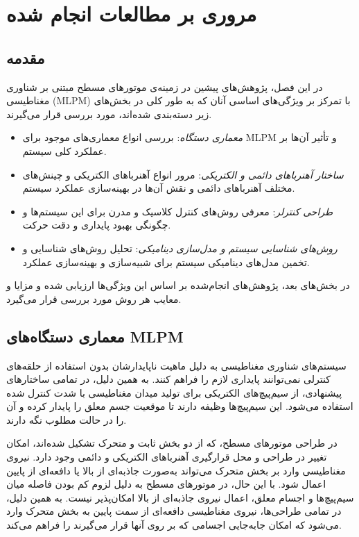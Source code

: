 \setcounter{topnumber}{5}      %
\setcounter{totalnumber}{5}    %
\renewcommand{\floatpagefraction}{.8}  %

\chapter{مروری بر مطالعات انجام شده}
\section{مقدمه}
در این فصل، پژوهش‌های پیشین در زمینه‌ی موتورهای مسطح مبتنی بر شناوری مغناطیسی (MLPM) با تمرکز بر ویژگی‌های اساسی آنان که به طور کلی در بخش‌های زیر دسته‌بندی شده‌اند، مورد بررسی قرار می‌گیرند. 
\begin{itemize}
	\item
		\textit{معماری دستگاه}:
بررسی انواع معماری‌های موجود برای MLPM و تأثیر آن‌ها بر عملکرد کلی سیستم.
	\item
		\textit{ساختار آهنرباهای دائمی و الکتریکی}:
مرور انواع آهنرباهای الکتریکی و چینش‌های مختلف آهنربا‌های دائمی و نقش آن‌ها در بهینه‌سازی عملکرد سیستم.
	\item
		\textit{طراحی کنترلر}:
معرفی روش‌های کنترل کلاسیک و مدرن برای این سیستم‌ها و چگونگی بهبود پایداری و دقت حرکت.
	\item
		\textit{روش‌های شناسایی سیستم و مدل‌سازی دینامیکی}:
تحلیل روش‌های شناسایی و تخمین مدل‌های دینامیکی سیستم برای شبیه‌سازی و بهینه‌سازی عملکرد.
\end{itemize}
در بخش‌های بعد، پژوهش‌های انجام‌شده بر اساس این ویژگی‌ها ارزیابی شده و مزایا و معایب هر روش مورد بررسی قرار می‌گیرد.

\section{معماری دستگاه‌های MLPM}
سیستم‌های شناوری مغناطیسی به دلیل ماهیت ناپایدارشان بدون استفاده از حلقه‌های کنترلی نمی‌توانند پایداری لازم را فراهم کنند. به همین دلیل، در تمامی ساختارهای پیشنهادی، از سیم‌پیچ‌های الکتریکی برای تولید میدان مغناطیسی با شدت کنترل ‌شده استفاده می‌شود. این سیم‌پیچ‌ها وظیفه دارند تا موقعیت جسم معلق را پایدار کرده و آن را در حالت مطلوب نگه ‌دارند.

در طراحی موتورهای مسطح، که از دو بخش ثابت
 و متحرک
تشکیل شده‌اند، امکان تغییر در طراحی و محل قرارگیری آهنرباهای الکتریکی و دائمی وجود دارد. نیروی مغناطیسی وارد بر بخش متحرک می‌تواند به‌صورت جاذبه‌ای از بالا یا دافعه‌ای از پایین اعمال شود. با این حال، در موتورهای مسطح به دلیل لزوم کم بودن فاصله میان سیم‌پیچ‌ها و اجسام معلق، اعمال نیروی جاذبه‌ای از بالا امکان‌پذیر نیست. به همین دلیل، در تمامی طراحی‌ها، نیروی مغناطیسی دافعه‌ای از سمت پایین به بخش متحرک وارد می‌شود که امکان جابه‌جایی اجسامی که بر روی آنها قرار می‌گیرند را فراهم می‌کند.

